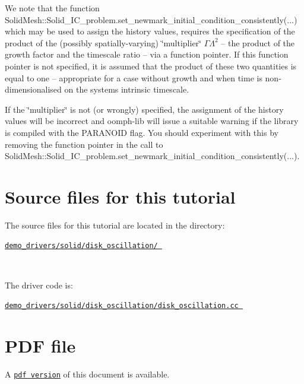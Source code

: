 We note that the function {\ttfamily Solid\+Mesh\+::\+Solid\+\_\+\+I\+C\+\_\+problem.\+set\+\_\+newmark\+\_\+initial\+\_\+condition\+\_\+consistently}(...) which may be used to assign the history values, requires the specification of the product of the (possibly spatially-\/varying) \char`\"{}multiplier\char`\"{} $\Gamma \Lambda^2 $ -- the product of the growth factor and the timescale ratio -- via a function pointer. If this function pointer is not specified, it is assumed that the product of these two quantities is equal to one -- appropriate for a case without growth and when time is non-\/dimensionalised on the system\textquotesingle{}s intrinsic timescale.

If the \char`\"{}multiplier\char`\"{} is not (or wrongly) specified, the assignment of the history values will be incorrect and {\ttfamily oomph-\/lib} will issue a suitable warning if the library is compiled with the {\ttfamily P\+A\+R\+A\+N\+O\+ID} flag. You should experiment with this by removing the function pointer in the call to {\ttfamily Solid\+Mesh\+::\+Solid\+\_\+\+I\+C\+\_\+problem.\+set\+\_\+newmark\+\_\+initial\+\_\+condition\+\_\+consistently}(...).



 

\hypertarget{index_sources}{}\section{Source files for this tutorial}\label{index_sources}

\begin{DoxyItemize}
\item The source files for this tutorial are located in the directory\+:~\newline
~\newline
\begin{center} \href{../../../../demo_drivers/solid/disk_oscillation/}{\tt demo\+\_\+drivers/solid/disk\+\_\+oscillation/ } \end{center} ~\newline

\item The driver code is\+: ~\newline
~\newline
\begin{center} \href{../../../../demo_drivers/solid/disk_oscillation/disk_oscillation.cc}{\tt demo\+\_\+drivers/solid/disk\+\_\+oscillation/disk\+\_\+oscillation.\+cc } \end{center} 
\end{DoxyItemize}

 

 \hypertarget{index_pdf}{}\section{P\+D\+F file}\label{index_pdf}
A \href{../latex/refman.pdf}{\tt pdf version} of this document is available. 

